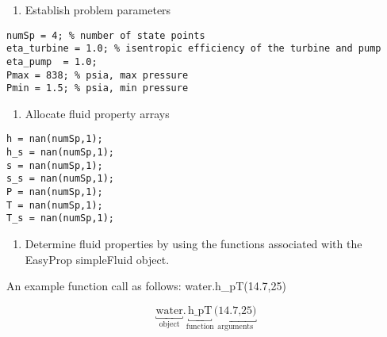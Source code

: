 \begin{enumerate}[resume]
\item Establish problem parameters
\end{enumerate}

\begin{lstlisting}[caption=Set problem parameters]
numSp = 4; % number of state points
eta_turbine = 1.0; % isentropic efficiency of the turbine and pump
eta_pump  = 1.0;
Pmax = 838; % psia, max pressure
Pmin = 1.5; % psia, min pressure
\end{lstlisting}

\begin{enumerate}[resume]
\item Allocate fluid property arrays   
\end{enumerate}

\begin{lstlisting}[caption=Allocate arrays to hold fluid property data.]
%% declare fluid property arrays
h = nan(numSp,1);
h_s = nan(numSp,1);
s = nan(numSp,1);
s_s = nan(numSp,1);
P = nan(numSp,1);
T = nan(numSp,1);
T_s = nan(numSp,1);
\end{lstlisting}

\begin{enumerate}[resume]
\item Determine fluid properties by using the functions associated with the EasyProp simpleFluid object.
\end{enumerate}

An example function call as follows: water.h\_pT(14.7,25)

\begin{equation*}
\underbracket{\text{water}}_{\text{object}}.\underbracket{\text{h\_pT}}_{\text{function}}\underbracket{\text{(14.7,25)}}_{\text{arguments}}
\end{equation*}

